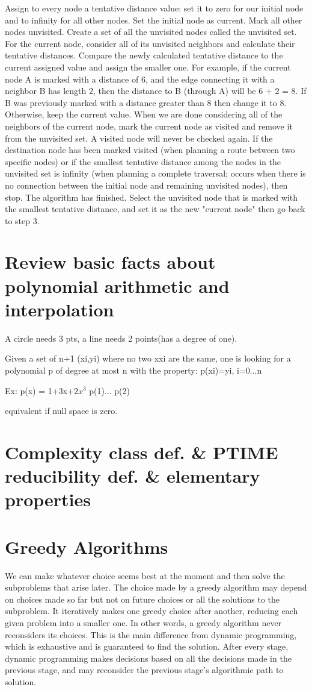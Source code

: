 \documentclass[10 pt]{article}
\begin{document}
Assign to every node a tentative distance value: set it to zero for our initial node and to infinity for all other nodes.
Set the initial node as current. Mark all other nodes unvisited. Create a set of all the unvisited nodes called the unvisited set.
For the current node, consider all of its unvisited neighbors and calculate their tentative distances. Compare the newly calculated tentative distance to the current assigned value and assign the smaller one. For example, if the current node A is marked with a distance of 6, and the edge connecting it with a neighbor B has length 2, then the distance to B (through A) will be 6 + 2 = 8. If B was previously marked with a distance greater than 8 then change it to 8. Otherwise, keep the current value.
When we are done considering all of the neighbors of the current node, mark the current node as visited and remove it from the unvisited set. A visited node will never be checked again.
If the destination node has been marked visited (when planning a route between two specific nodes) or if the smallest tentative distance among the nodes in the unvisited set is infinity (when planning a complete traversal; occurs when there is no connection between the initial node and remaining unvisited nodes), then stop. The algorithm has finished.
Select the unvisited node that is marked with the smallest tentative distance, and set it as the new "current node" then go back to step 3.

\section{Review basic facts about polynomial arithmetic and interpolation}
A circle needs 3 pts, a line needs 2 points(has a degree of one).

Given a set of n+1 (xi,yi) where no two xxi are the same, one is looking for a polynomial p of degree at most n with the property: p(xi)=yi, i=0...n

Ex: p(x) = 1+3x+$2x^3$ 
p(1)... 
p(2)

equivalent if null space is zero.

\section{Complexity class def. \& PTIME reducibility def. \& elementary properties}

\section{Greedy Algorithms}
We can make whatever choice seems best at the moment and then solve the subproblems that arise later. The choice made by a greedy algorithm may depend on choices made so far but not on future choices or all the solutions to the subproblem. It iteratively makes one greedy choice after another, reducing each given problem into a smaller one. In other words, a greedy algorithm never reconsiders its choices. This is the main difference from dynamic programming, which is exhaustive and is guaranteed to find the solution. After every stage, dynamic programming makes decisions based on all the decisions made in the previous stage, and may reconsider the previous stage's algorithmic path to solution.
\end{document}
